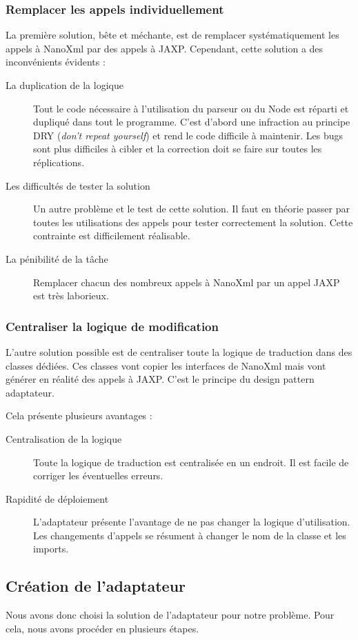 \subsubsection{Remplacer les appels individuellement}
La première solution, bête et méchante, est de remplacer systématiquement les appels à NanoXml par des appels à JAXP.
Cependant, cette solution a des inconvénients évidents :
\begin{description}
\item[La duplication de la logique] Tout le code nécessaire à l'utilisation du parseur ou du Node est réparti et dupliqué dans tout le programme.
C'est d'abord une infraction au principe DRY (\textit{don't repeat yourself}) et rend le code difficile à maintenir.
Les bugs sont plus difficiles à cibler et la correction doit se faire sur toutes les réplications.
\item[Les difficultés de tester la solution] Un autre problème et le test de cette solution.
Il faut en théorie passer par toutes les utilisations des appels pour tester correctement la solution. Cette contrainte est difficilement réalisable.
\item[La pénibilité de la tâche] Remplacer chacun des nombreux appels à NanoXml par un appel JAXP est très laborieux.
\end{description}
\subsubsection{Centraliser la logique de modification}
L'autre solution possible est de centraliser toute la logique de traduction dans des classes dédiées.
Ces classes vont copier les interfaces de NanoXml mais vont générer en réalité des appels à JAXP.
C'est le principe du design pattern adaptateur.

Cela présente plusieurs avantages :
\begin{description}
\item[Centralisation de la logique] Toute la logique de traduction est centralisée en un endroit. Il est facile de corriger les éventuelles erreurs.
\item[Rapidité de déploiement] L'adaptateur présente l'avantage de ne pas changer la logique d'utilisation. Les changements d'appels se résument à changer le nom de la classe et les imports.
\end{description}

\subsection{Création de l'adaptateur}
Nous avons donc choisi la solution de l'adaptateur pour notre problème. Pour cela, nous avons procéder en plusieurs étapes.

